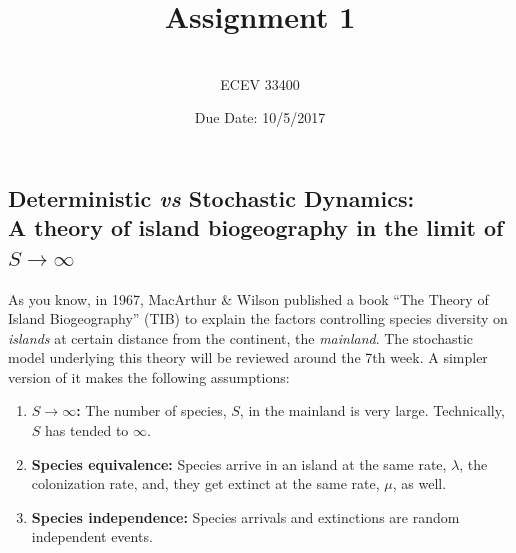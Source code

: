 \documentclass[11pt]{article}
\begin{document}

\title{Assignment 1} %
\author{ \\ECEV 33400} %
\date{Due Date: 10/5/2017} %

\maketitle

%
%

\subsection*{Deterministic {\em vs} Stochastic Dynamics:\\ A theory of island biogeography in the limit of $S \rightarrow \infty$}
As you know, in 1967, MacArthur \& Wilson published a book ``The Theory of Island Biogeography'' (TIB) to explain the factors controlling species diversity on {\em islands} at certain distance from the continent, the {\em mainland}. The stochastic model underlying this theory will be reviewed around the 7th week. A simpler version of it makes the following assumptions:
\begin{enumerate}
  \item {\bf $S \rightarrow \infty$:} The number of species, $S$, in the mainland is very large. Technically, $S$ has tended to $\infty$.
  \item {\bf Species equivalence:} Species arrive in an island at the same rate, $\lambda$, the colonization rate, and, they get extinct at the same rate, $\mu$, as well.
  \item {\bf Species independence:} Species arrivals and extinctions are random independent events. 
\end{enumerate}
\end{document}
